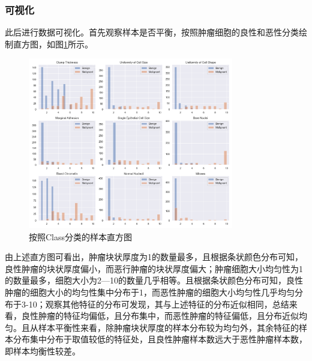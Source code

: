 \documentclass[a4paper,12pt,onecolumn,oneside]{article}
\begin{document}
\subsubsection{可视化}
此后进行数据可视化。首先观察样本是否平衡，按照肿瘤细胞的良性和恶性分类绘制直方图，如图\ref{fig:hist2}所示。\par
\begin{figure}[H]
	\centering
	\includegraphics[width=0.8\textwidth]{res3/hist2.png}
	\caption{按照Class分类的样本直方图}
	\label{fig:hist2}
\end{figure}
由上述直方图可看出，肿瘤块状厚度为1的数量最多，且根据条状颜色分布可知，良性肿瘤的块状厚度偏小，而恶行肿瘤的块状厚度偏大；肿瘤细胞大小均匀性为1的数量最多，细胞大小为2—10的数量几乎相等。且根据条状颜色分布可知，良性肿瘤的细胞大小的均匀性集中分布于1，而恶性肿瘤的细胞大小均匀性几乎均匀分布于3-10；观察其他特征的分布可发现，其与上述特征的分布近似相同，总结来看，良性肿瘤的特征均偏低，且分布集中，而恶性肿瘤的特征偏低，且分布近似均匀。且从样本平衡性来看，除肿瘤块状厚度的样本分布较为均匀外，其余特征的样本分布集中分布于取值较低的特征处，且良性肿瘤样本数远大于恶性肿瘤样本数，即样本均衡性较差。\par 
\end{document}
